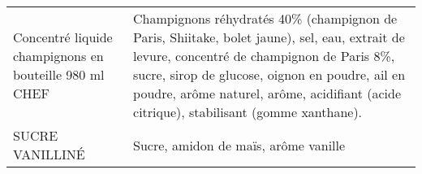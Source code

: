 \begin{longtable}{p{5cm}p{10cm}}
                                                   Concentré liquide champignons en bouteille 980 ml CHEF &                                                                                                                                                                                                                                                                                                                                                                                                                                                                                                                                                                                                                                                                                                                                                    Champignons réhydratés 40\% (champignon de Paris, Shiitake, bolet jaune), sel, eau, extrait de levure, concentré de champignon de Paris 8\%, sucre, sirop de glucose, oignon en poudre, ail en poudre, arôme naturel, arôme, acidifiant (acide citrique), stabilisant (gomme xanthane). \\
                                                                                          SUCRE VANILLINÉ &                                                                                                                                                                                                                                                                                                                                                                                                                                                                                                                                                                                                                                                                                                                                                                                                                                                                                                                                                                                                     Sucre, amidon de maïs, arôme vanille \\

\end{longtable}
